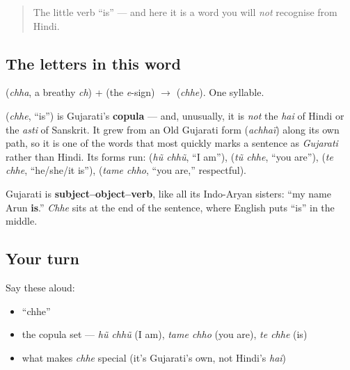 \label{lesson:GU-C02-chhe}



\begin{quote}
The little verb \textquotedblleft{}is\textquotedblright{} — and here it is a word you will \emph{not} recognise from Hindi.
\end{quote}

\subsection*{The letters in this word}
\textbf{} (\emph{chha}, a breathy \emph{ch}) + \textbf{} (the \emph{e}-sign) $\to$ \textbf{} (\emph{chhe}). One syllable.

\begin{cousinweb}
\textbf{} (\emph{chhe}, \textquotedblleft{}is\textquotedblright{}) is Gujarati's \textbf{copula} — and, unusually, it is \emph{not} the \emph{hai} of Hindi or the \emph{asti} of Sanskrit. It grew from an Old Gujarati form (\emph{achhaï}) along its own path, so it is one of the words that most quickly marks a sentence as \emph{Gujarati} rather than Hindi. Its forms run: \textbf{ } (\emph{hũ chhũ}, \textquotedblleft{}I am\textquotedblright{}), \textbf{ } (\emph{tũ chhe}, \textquotedblleft{}you are\textquotedblright{}), \textbf{ } (\emph{te chhe}, \textquotedblleft{}he/she/it is\textquotedblright{}), \textbf{ } (\emph{tame chho}, \textquotedblleft{}you are,\textquotedblright{} respectful).
\end{cousinweb}

\begin{grammarlens}[title={Grammar Lens: the verb goes last}]
Gujarati is \textbf{subject–object–verb}, like all its Indo-Aryan sisters: \textquotedblleft{}my name Arun \textbf{is}.\textquotedblright{} \emph{Chhe} sits at the end of the sentence, where English puts \textquotedblleft{}is\textquotedblright{} in the middle.
\end{grammarlens}

\subsection*{Your turn}
Say these aloud:

\begin{itemize}
\raggedright
  \item \textquotedblleft{}chhe\textquotedblright{}
  \item the copula set — \emph{hũ chhũ} (I am), \emph{tame chho} (you are), \emph{te chhe} (is)
  \item what makes \emph{chhe} special (it's Gujarati's own, not Hindi's \emph{hai})
\end{itemize}

